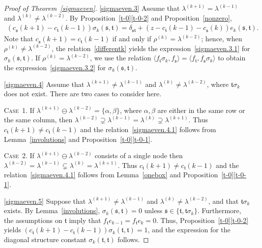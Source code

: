 \documentclass[11pt,a4paper,reqno,svgnames]{amsart}
\theoremstyle{plain}
\theoremstyle{definition}
\numberwithin{equation}{section}
\begin{document}
\begin{proof}[Proof of Theorem~\ref{sigmaeven}]
\eqref{sigmaeven.3} Assume that  $\lambda^{(k+1)}=\lambda^{(k-1)}$ and $\lambda^{(k)}\ne\lambda^{(k-2)}$. By Proposition~\ref{t-0}\eqref{t-0-2} and Proposition~\ref{nonzero},
\begin{align}\label{differentk}
(c_\mathfrak{s}(k+1)-c_\mathfrak{t}(k-1))\sigma_k(\mathfrak{s,t})=\delta_\mathfrak{st}+(z-c_\mathfrak{t}(k-1)-c_\mathfrak{s}(k))e_k(\mathfrak{s,t}).
\end{align}
Note that $c_\mathfrak{s}(k+1)=c_\mathfrak{t}(k-1)$ if and only if $\rho^{(k)}=\lambda^{(k-2)}$; hence, when $\rho^{(k)}\ne\lambda^{(k-2)}$, the relation~\eqref{differentk} yields the expression~\eqref{sigmaeven.3.1} for $\sigma_k(\mathfrak{s,t})$. If $\rho^{(k)}=\lambda^{(k-2)}$, we use the relation $\langle f_\mathfrak{t}\sigma_k,f_\mathfrak{s}\rangle =\langle f_\mathfrak{t},f_\mathfrak{s}\sigma_k\rangle$ to obtain the expression~\eqref{sigmaeven.3.2} for $\sigma_k(\mathfrak{s,t})$. 

\eqref{sigmaeven.4} Assume  that $\lambda^{(k+1)}\ne\lambda^{(k-1)}$ and $\lambda^{(k)}\ne\lambda^{(k-2)}$, where $\mathfrak{t}\sigma_k$ does not exist.  There are two cases to consider here.

{\textsc{Case~1.}} If $\lambda^{(k+1)}\ominus\lambda^{(k-2)}=\lbrace \alpha,\beta\rbrace$, where $\alpha,\beta$ are either in the same row or the same column, then $\lambda^{(k-2)}\supsetneq \lambda^{(k-1)}=\lambda^{(k)}\supsetneq\lambda^{(k+1)}$. Thus $c_\mathfrak{t}(k+1)\ne c_\mathfrak{t}(k-1)$ and the relation~\eqref{sigmaeven.4.1} follows from  Lemma~\ref{involutions} and Proposition~\ref{t-0}\eqref{t-0-1}. 

 {\textsc{Case~2.}}  If $\lambda^{(k+1)}\ominus\lambda^{(k-2)}$ consists of a single node then $\lambda^{(k-2)}=\lambda^{(k-1)}\subsetneq\lambda^{(k)}=\lambda^{(k+1)}$. Thus $c_\mathfrak{t}(k+1)\ne c_\mathfrak{t}(k-1)$ and the relation~\eqref{sigmaeven.4.1} follows from  Lemma~\ref{onebox} and Proposition~\ref{t-0}\eqref{t-0-1}. 

\eqref{sigmaeven.5} Suppose that $\lambda^{(k+1)}\ne\lambda^{(k-1)}$ and $\lambda^{(k)}\ne\lambda^{(k-2)}$, and that $\mathfrak{t}\sigma_{k}$ exists. By Lemma~\ref{involutions}, 
$\sigma_k(\mathfrak{s,t})=0$ unless $\mathfrak{s}\in\lbrace\mathfrak{t},\mathfrak{t}\sigma_{k}\rbrace$. Furthermore, the assumptions on $\mathfrak{t}$ imply that $f_\mathfrak{t} e_{k-1}=f_\mathfrak{t} e_{k}=0$.
Thus, Proposition~\ref{t-0}\eqref{t-0-2} yields $
(c_\mathfrak{t}(k+1)-c_\mathfrak{t}(k-1))\sigma_{k}(\mathfrak{t},\mathfrak{t})=1$, 
and the expression for the diagonal structure constant $\sigma_{k}(\mathfrak{t},\mathfrak{t})$ follows.


\end{proof}
\end{document}
